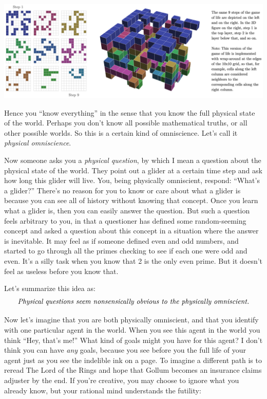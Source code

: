 \documentclass[11pt, oneside]{article}   	%
\begin{document}
\begin{center}
\includegraphics[width=\textwidth]{gameoflife_3d.png}
\end{center}



Hence you ``know everything'' in the sense that you know the full physical state
of the world. Perhaps you don't know all possible mathematical truths, or all
other possible worlds. So this is a certain kind of omniscience. Let's call it
{\em physical omniscience}.

Now someone asks you a {\em physical question}, by which I mean
a question about the physical state of the world.
They point out a glider at a certain time step and
ask how long this glider will live. You, being physically omniscient,
respond:
``What's a glider?'' There's no reason for you to know or care about what a
glider is because you can see all of history without knowing that concept.
Once you
learn what a glider is, then you can easily answer the question. But such a
question feels arbitrary to you, in that a questioner has defined some
random-seeming concept and asked a question about this concept in a situation
where
the answer is inevitable. It may feel as if someone defined even and odd
numbers, and started to go through all the primes checking to see if each one
were odd and even. It's a silly task when you know that 2 is the only
even prime. But it doesn't feel as useless before you know that.

Let's summarize this idea as:
\begin{equation*}\label{eq1}
    \text{\em Physical questions seem nonsensically obvious to the physically
    omniscient.}
\end{equation*}

Now let's imagine that you are both physically omniscient, and that you identify
with one particular agent in the world.
When you see this agent in the world you
think ``Hey, that's me!'' What kind of goals might you have for this agent? I
don't think you can have {\em any} goals, because you see before you the
full life of your agent just as you see the indelible ink on a page. To imagine
a different path is to reread The Lord of the Rings and hope that Gollum
becomes an insurance claims adjuster by the end. If you're creative, you may
choose to ignore what you already know, but your rational mind understands the
futility:
\end{document}
